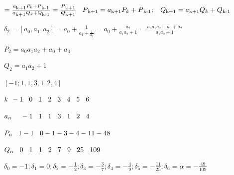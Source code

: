 \documentclass[12pt]{article}
\begin{document}
$= \frac{a\textsubscript{k+1} P_k + P\textsubscript{k-1}}{a\textsubscript{k+1} Q_k + Q\textsubscript{k-1}} = \frac{P\textsubscript{k+1}}{Q\textsubscript{k+1}} \hspace{2 ex} P\textsubscript{k+1} = a\textsubscript{k+1} P_k + P\textsubscript{k-1} ; \hspace{2 ex} Q\textsubscript{k+1} = a\textsubscript{k+1} Q_k + Q\textsubscript{k-1} \vspace{2 ex}$


$\delta_2 = [a_0,a_1,a_2] = a_0 + \frac{1}{a_1 + \frac{1}{a_2}} = a_0 + \frac{a_2}{a_1 a_2 + 1} = \frac{a_0 a_1 a_2 + a_0 + a_2}{a_1 a_2 + 1}$

$P_2 = a_0 a_1 a_2 + a_0 + a_3$

$Q_2 = a_1 a_2 +1$

$[-1;1,1,3,1,2,4]$

$k \hspace{1 ex} -1\hspace{2 ex}0\hspace{2 ex}1\hspace{2 ex}2\hspace{2 ex}3\hspace{2 ex}4\hspace{2 ex}5\hspace{2 ex}6$

$a_n  \hspace{1 ex}\hspace{2 ex}-1\hspace{2 ex}1\hspace{2 ex}1\hspace{2 ex}3\hspace{2 ex}1\hspace{2 ex}2\hspace{2 ex}4$

$P_n \hspace{2 ex} 1-1\hspace{2 ex}0-1-3-4-11-48$

$Q_n \hspace{2 ex} 0\hspace{2 ex}1\hspace{2 ex}1\hspace{2 ex}2\hspace{2 ex}7\hspace{2 ex}9\hspace{2 ex}25\hspace{2 ex}109$

$\delta_0 = -1; \delta_1 = 0; \delta_2 = -\frac{1}{2} ;\delta_3 = -\frac{3}{7} ; \delta_4 =-\frac{4}{9} ; \delta_5 = -\frac{11}{25} ; \delta_6 = \alpha = -\frac{48}{109}$
\end{document}
